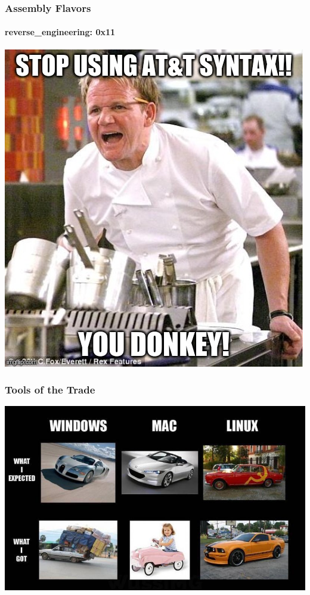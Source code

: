 \documentclass[aspectratio=169]{beamer}
\begin{document}
\begin{frame}
  \frametitle{Assembly Flavors}
  \framesubtitle{reverse\_engineering: 0x11}
  \begin{center}
    \includegraphics[scale=0.35]{intel-vs-atnt-meme}
  \end{center}
\end{frame}

\begin{frame}
  \frametitle{Tools of the Trade}
  \begin{center}
    \includegraphics[scale=0.5]{mac-meme}
  \end{center}
\end{frame}
\end{document}
